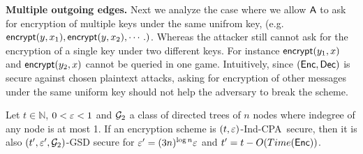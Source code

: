 \documentclass{article}
\newcommand{\tcpa}{$(t,\eps)$-Ind-CPA}
\def\A{{\sf A}}
\newcommand{\encrypt}{{\sf encrypt}}
\begin{document}
\textbf{Multiple outgoing edges.} Next we analyze the case where we allow $\A$ to ask for encryption of multiple keys under the same unifrom key, (e.g. $\encrypt(y,x_1), \encrypt(y,x_2), \cdots.)$. Whereas the attacker still cannot ask for the encryption of a single key under two different keys. For instance $\encrypt(y_1,x)$ and $ \encrypt(y_2,x)$ cannot be queried in one game. Intuitively, since $({\sf Enc},{\sf Dec})$ is secure against chosen plaintext attacks, asking for encryption of other messages under the same uniform key should not help the adversary to break the scheme. 

\begin{theorem}\label{thm:1in-Mout}
Let $t \in \mathbb{N}$, $0<\varepsilon<1$ and ${\cal G}_2$ a class of directed trees of $n$ nodes where indegree of any node is at most 1. If an encryption scheme is \tcpa~secure, then it is also $(t',\varepsilon',{\cal G}_2)$-GSD secure for $\varepsilon'=(3n)^{\log n} \varepsilon$ and $t'=t-O(Time({\sf Enc}))$.
\end{theorem}
\end{document}
